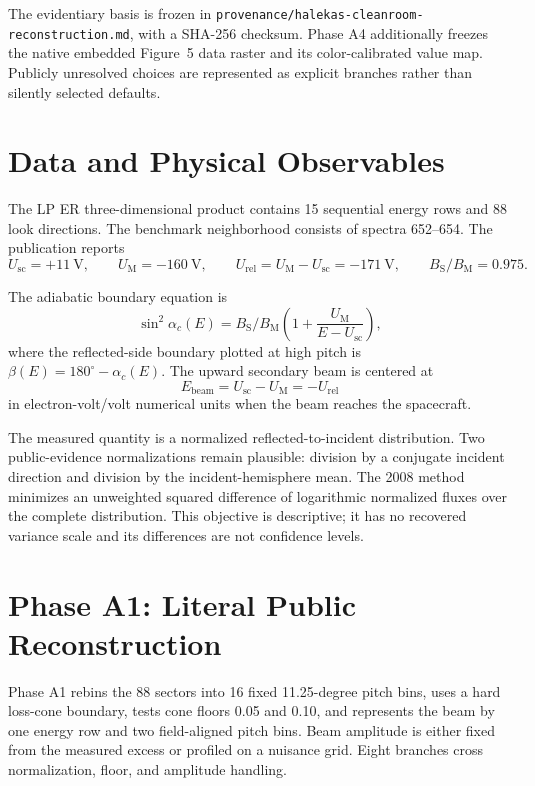 \documentclass[11pt]{article}
\newcommand{\UM}{U_{\mathrm{M}}}
\newcommand{\Usc}{U_{\mathrm{sc}}}
\newcommand{\Urel}{U_{\mathrm{rel}}}
\newcommand{\BSBM}{B_{\mathrm{S}}/B_{\mathrm{M}}}
\newcommand{\code}[1]{\texttt{#1}}
\begin{document}
The evidentiary basis is frozen in
\code{provenance/halekas-cleanroom-reconstruction.md}, with a SHA-256 checksum.
Phase A4 additionally freezes the native embedded Figure~5 data raster and its
color-calibrated value map.  Publicly unresolved choices are represented as
explicit branches rather than silently selected defaults.

\section{Data and Physical Observables}

The LP ER three-dimensional product contains 15 sequential energy rows and 88
look directions.  The benchmark neighborhood consists of spectra 652--654.
The publication reports
\begin{equation}
  \Usc=+11~\mathrm{V},\qquad
  \UM=-160~\mathrm{V},\qquad
  \Urel=\UM-\Usc=-171~\mathrm{V},\qquad
  \BSBM=0.975.
\end{equation}

The adiabatic boundary equation is
\begin{equation}
  \sin^2\alpha_c(E)=\BSBM
  \left(1+\frac{\UM}{E-\Usc}\right),
  \label{eq:boundary}
\end{equation}
where the reflected-side boundary plotted at high pitch is
$\beta(E)=180^\circ-\alpha_c(E)$.  The upward secondary beam is centered at
\begin{equation}
  E_{\mathrm{beam}}=\Usc-\UM=-\Urel
\end{equation}
in electron-volt/volt numerical units when the beam reaches the spacecraft.

The measured quantity is a normalized reflected-to-incident distribution.
Two public-evidence normalizations remain plausible: division by a conjugate
incident direction and division by the incident-hemisphere mean.  The 2008
method minimizes an unweighted squared difference of logarithmic normalized
fluxes over the complete distribution.  This objective is descriptive; it has
no recovered variance scale and its differences are not confidence levels.

\section{Phase A1: Literal Public Reconstruction}

Phase A1 rebins the 88 sectors into 16 fixed 11.25-degree pitch bins, uses a
hard loss-cone boundary, tests cone floors 0.05 and 0.10, and represents the
beam by one energy row and two field-aligned pitch bins.  Beam amplitude is
either fixed from the measured excess or profiled on a nuisance grid.  Eight
branches cross normalization, floor, and amplitude handling.
\end{document}
